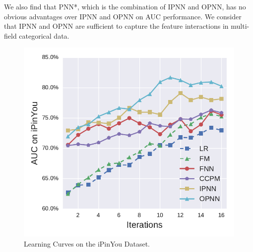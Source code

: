 \documentclass[conference]{IEEEtran}
\newcommand{\kan}[1]{{\bf \color{green} [[Kan says ``#1'']]}}
\begin{document}
We also find that PNN*, which is the combination of IPNN and OPNN, has no obvious advantages over IPNN and OPNN on AUC performance.
We consider that IPNN and OPNN are sufficient to capture the feature interactions in multi-field categorical data.




\begin{figure}[t]
	\centering
	\includegraphics[width=0.7\columnwidth]{figure/train-2.pdf}
	\caption{Learning Curves on the iPinYou Dataset.}\label{fig:train}
\end{figure}
\end{document}
